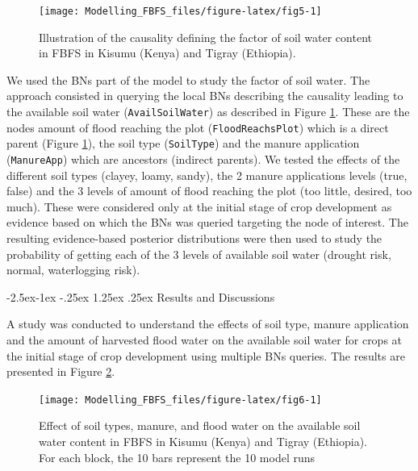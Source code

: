 \documentclass[12pt,oneside]{article}
\makeatletter
\renewcommand\paragraph{\@startsection{paragraph}{4}{\z@}%
            {-2.5ex\@plus -1ex \@minus -.25ex}%
            {1.25ex \@plus .25ex}%
            {\normalfont\normalsize\bfseries}}
\makeatother
\begin{document}
\begin{figure}[!htbp]

{\centering \texttt{[image: Modelling\_FBFS\_files/figure-latex/fig5-1]} 

}

\caption{Illustration of the causality defining the factor of soil water content in FBFS in Kisumu (Kenya) and Tigray (Ethiopia).}\label{fig:fig5}
\end{figure}

We used the BNs part of the model to study the factor of soil water. The approach consisted in querying the local BNs describing the causality leading to the available soil water (\texttt{AvailSoilWater}) as described in Figure \ref{fig:fig5}. These are the nodes amount of flood reaching the plot (\texttt{FloodReachsPlot}) which is a direct parent (Figure \ref{fig:fig5}), the soil type (\texttt{SoilType}) and the manure application (\texttt{ManureApp}) which are ancestors (indirect parents). We tested the effects of the different soil types (clayey, loamy, sandy), the 2 manure applications levels (true, false) and the 3 levels of amount of flood reaching the plot (too little, desired, too much). These were considered only at the initial stage of crop development as evidence based on which the BNs was queried targeting the node of interest. The resulting evidence-based posterior distributions were then used to study the probability of getting each of the 3 levels of available soil water (drought risk, normal, waterlogging risk).

\hypertarget{IV213}{%
\paragraph{Results and Discussions}\label{IV213}}

A study was conducted to understand the effects of soil type, manure application and the amount of harvested flood water on the available soil water for crops at the initial stage of crop development using multiple BNs queries. The results are presented in Figure \ref{fig:fig6}.

\begin{figure}[!htbp]

{\centering \texttt{[image: Modelling\_FBFS\_files/figure-latex/fig6-1]} 

}

\caption{Effect of soil types, manure, and flood water on the available soil water content in FBFS in Kisumu (Kenya) and Tigray (Ethiopia). For each block, the 10 bars represent the 10 model runs}\label{fig:fig6}
\end{figure}
\end{document}
